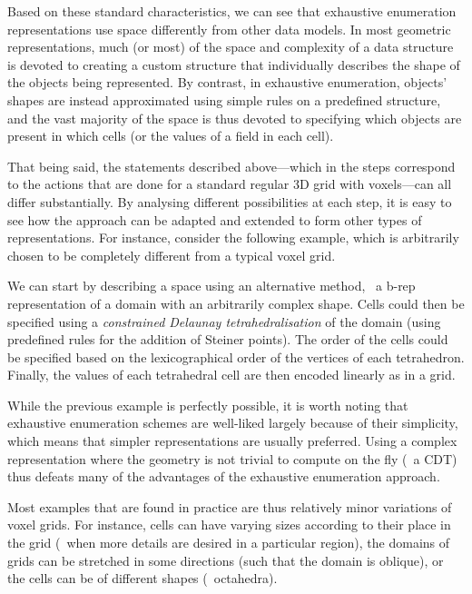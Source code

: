 Based on these standard characteristics, we can see that exhaustive enumeration representations use space differently from other data models.
In most geometric representations, much (or most) of the space and complexity of a data structure is devoted to creating a custom structure that individually describes the shape of the objects being represented.
By contrast, in exhaustive enumeration, objects' shapes are instead approximated using simple rules on a predefined structure, and the vast majority of the space is thus devoted to specifying which objects are present in which cells (or the values of a field in each cell).

That being said, the statements described above---which in the steps correspond to the actions that are done for a standard regular 3D grid with voxels---can all differ substantially.
By analysing different possibilities at each step, it is easy to see how the approach can be adapted and extended to form other types of representations.
For instance, consider the following example, which is arbitrarily chosen to be completely different from a typical voxel grid.

We can start by describing a space using an alternative method, \eg\ a b-rep representation of a domain with an arbitrarily complex shape.
Cells could then be specified using a \emph{constrained Delaunay tetrahedralisation} of the domain (using predefined rules for the addition of Steiner points).
The order of the cells could be specified based on the lexicographical order of the vertices of each tetrahedron.
Finally, the values of each tetrahedral cell are then encoded linearly as in a grid.

While the previous example is perfectly possible, it is worth noting that exhaustive enumeration schemes are well-liked largely because of their simplicity, which means that simpler representations are usually preferred.
Using a complex representation where the geometry is not trivial to compute on the fly (\eg\ a CDT) thus defeats many of the advantages of the exhaustive enumeration approach.

Most examples that are found in practice are thus relatively minor variations of voxel grids.
For instance, cells can have varying sizes according to their place in the grid (\eg\ when more details are desired in a particular region), the domains of grids can be stretched in some directions (such that the domain is oblique), or the cells can be of different shapes (\eg\ octahedra).

